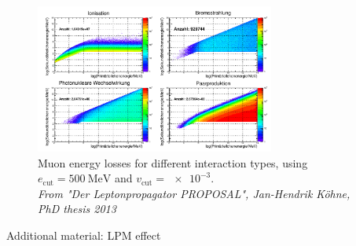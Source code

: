 \documentclass[aspectratio=1610, 9pt]{beamer}
\begin{document}
\begin{frame}
            \begin{figure}
                \centering
                \includegraphics[width=0.7\textwidth]{plots/cut_diss_500_1e-3.png}
                \caption{Muon energy losses for different interaction types, using $e_\text{cut} = \SI{500}{\mega\electronvolt}$ and $v_\text{cut} = \num{e-3}$.\\ \emph{From "Der Leptonpropagator PROPOSAL", Jan-Hendrik Köhne, PhD thesis 2013}}
            \end{figure}
\end{frame}

\begin{frame}
  \begin{center}
    \Huge Additional material: LPM effect
  \end{center}
\end{frame}


{

}

{

}


{

}
\end{document}
